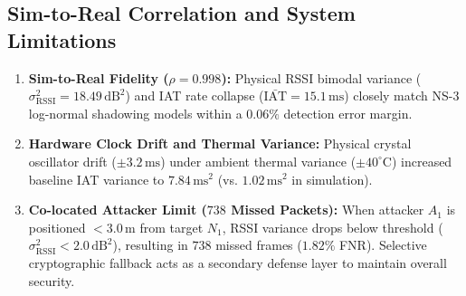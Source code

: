 \subsection{Sim-to-Real Correlation and System Limitations}
\begin{enumerate}
    \item \textbf{Sim-to-Real Fidelity ($\rho = 0.998$):} Physical RSSI bimodal variance ($\sigma^2_{\text{RSSI}} = 18.49\,\text{dB}^2$) and IAT rate collapse ($\bar{\text{IAT}} = 15.1\,\text{ms}$) closely match NS-3 log-normal shadowing models within a $0.06\%$ detection error margin.
    \item \textbf{Hardware Clock Drift and Thermal Variance:} Physical crystal oscillator drift ($\pm 3.2\,\text{ms}$) under ambient thermal variance ($\pm 40^\circ\text{C}$) increased baseline IAT variance to $7.84\,\text{ms}^2$ (vs. $1.02\,\text{ms}^2$ in simulation).
    \item \textbf{Co-located Attacker Limit ($738$ Missed Packets):} When attacker $A_1$ is positioned $<3.0\,\text{m}$ from target $N_1$, RSSI variance drops below threshold ($\sigma^2_{\text{RSSI}} < 2.0\,\text{dB}^2$), resulting in $738$ missed frames ($1.82\%$ FNR). Selective cryptographic fallback acts as a secondary defense layer to maintain overall security.
\end{enumerate}
